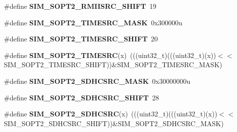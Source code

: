 \begin{DoxyCompactItemize}
\item 
\#define {\bfseries S\+I\+M\+\_\+\+S\+O\+P\+T2\+\_\+\+R\+M\+I\+I\+S\+R\+C\+\_\+\+S\+H\+I\+FT}~19\hypertarget{group__SIM__Register__Masks_ga53ce396f3ed312e00b1d31bb456b0707}{}\label{group__SIM__Register__Masks_ga53ce396f3ed312e00b1d31bb456b0707}

\item 
\#define {\bfseries S\+I\+M\+\_\+\+S\+O\+P\+T2\+\_\+\+T\+I\+M\+E\+S\+R\+C\+\_\+\+M\+A\+SK}~0x300000u\hypertarget{group__SIM__Register__Masks_gab50a6e7eaa3b552b96f8cd0450a95395}{}\label{group__SIM__Register__Masks_gab50a6e7eaa3b552b96f8cd0450a95395}

\item 
\#define {\bfseries S\+I\+M\+\_\+\+S\+O\+P\+T2\+\_\+\+T\+I\+M\+E\+S\+R\+C\+\_\+\+S\+H\+I\+FT}~20\hypertarget{group__SIM__Register__Masks_ga808182bbe91aa5fedaede7122e4af1aa}{}\label{group__SIM__Register__Masks_ga808182bbe91aa5fedaede7122e4af1aa}

\item 
\#define {\bfseries S\+I\+M\+\_\+\+S\+O\+P\+T2\+\_\+\+T\+I\+M\+E\+S\+RC}(x)~(((uint32\+\_\+t)(((uint32\+\_\+t)(x))$<$$<$S\+I\+M\+\_\+\+S\+O\+P\+T2\+\_\+\+T\+I\+M\+E\+S\+R\+C\+\_\+\+S\+H\+I\+FT))\&S\+I\+M\+\_\+\+S\+O\+P\+T2\+\_\+\+T\+I\+M\+E\+S\+R\+C\+\_\+\+M\+A\+SK)\hypertarget{group__SIM__Register__Masks_gaf2c6b0c71d3139118270e0ded3521f53}{}\label{group__SIM__Register__Masks_gaf2c6b0c71d3139118270e0ded3521f53}

\item 
\#define {\bfseries S\+I\+M\+\_\+\+S\+O\+P\+T2\+\_\+\+S\+D\+H\+C\+S\+R\+C\+\_\+\+M\+A\+SK}~0x30000000u\hypertarget{group__SIM__Register__Masks_gadfe4a9ff5d8ba836d827d0d265dc3055}{}\label{group__SIM__Register__Masks_gadfe4a9ff5d8ba836d827d0d265dc3055}

\item 
\#define {\bfseries S\+I\+M\+\_\+\+S\+O\+P\+T2\+\_\+\+S\+D\+H\+C\+S\+R\+C\+\_\+\+S\+H\+I\+FT}~28\hypertarget{group__SIM__Register__Masks_gac0d4558ce58c6d9bf19af4f36c363562}{}\label{group__SIM__Register__Masks_gac0d4558ce58c6d9bf19af4f36c363562}

\item 
\#define {\bfseries S\+I\+M\+\_\+\+S\+O\+P\+T2\+\_\+\+S\+D\+H\+C\+S\+RC}(x)~(((uint32\+\_\+t)(((uint32\+\_\+t)(x))$<$$<$S\+I\+M\+\_\+\+S\+O\+P\+T2\+\_\+\+S\+D\+H\+C\+S\+R\+C\+\_\+\+S\+H\+I\+FT))\&S\+I\+M\+\_\+\+S\+O\+P\+T2\+\_\+\+S\+D\+H\+C\+S\+R\+C\+\_\+\+M\+A\+SK)\hypertarget{group__SIM__Register__Masks_ga1e15b52db62a3ffff08350dc9c6f590d}{}\label{group__SIM__Register__Masks_ga1e15b52db62a3ffff08350dc9c6f590d}


\end{DoxyCompactItemize}
